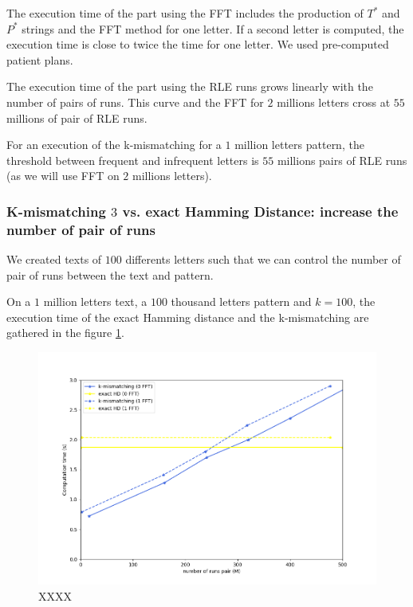 \documentclass[preprint,12pt]{elsarticle}
\begin{document}
The execution time of the part using the FFT includes the production of $T^*$ and $P^*$ strings
and the FFT method for one letter.
If a second letter is computed, the execution time is close to twice the time for one letter.
We used pre-computed patient plans. 

The execution time of the part using the RLE runs grows linearly with the number of pairs of runs.
This curve and the FFT for $2$ millions letters cross at $55$ millions of pair of RLE runs.   

For an execution of the k-mismatching for a $1$ million letters pattern,
the threshold between frequent and infrequent letters is $55$ millions pairs of RLE runs
(as we will use FFT on $2$ millions letters).



\subsubsection{K-mismatching $3$ vs. exact Hamming Distance: increase the number of pair of runs}

We created texts of $100$ differents letters such that we can control the number of pair of runs
between the text and pattern.

On a $1$ million letters text, a $100$ thousand letters pattern and $k = 100$,
the execution time of the exact Hamming distance and the k-mismatching are gathered in the figure \ref{Opti01FFT}.


\begin{figure}[h]
\includegraphics[scale=0.45]{./figures/Opti01FFT.png}
\caption{XXXX}
\label{Opti01FFT}
\end{figure}
\end{document}
